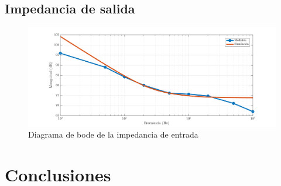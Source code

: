 \documentclass[../../e1_tp1_main.tex]{subfiles}
\begin{document}
\subsection{Impedancia de salida}


\begin{figure} [H]
	\centering
	\includegraphics[scale=0.65]{imagenes/e1_tp1_ej2_zout_mag.png}	
	\caption{Diagrama de bode de la impedancia de entrada}
\end{figure}




\section{Conclusiones}
\end{document}

